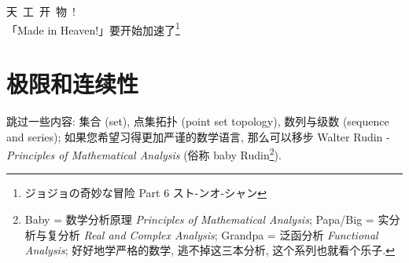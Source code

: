 \begin{flushright}{\kaishu 天\ 工\ 开\ 物\ !\\「Made in Heaven!」要开始加速了\footnote{ジョジョの奇妙な冒险 Part 6
  スト-ンオ-シャン}}\end{flushright}

\section{极限和连续性}\label{011}

跳过一些内容: 集合 (set), 点集拓扑 (point set topology), 数列与级数
(sequence and series); 如果您希望习得更加严谨的数学语言, 那么可以移步
Walter Rudin - \emph{Principles of Mathematical Analysis} (俗称 baby
Rudin\footnote{Baby = 数学分析原理 \emph{Principles of Mathematical
  Analysis}; Papa/Big = 实分析与复分析 \emph{Real and Complex Analysis};
  Grandpa = 泛函分析 \emph{Functional Analysis}; 好好地学严格的数学,
  逃不掉这三本分析, 这个系列也就看个乐子.}).

